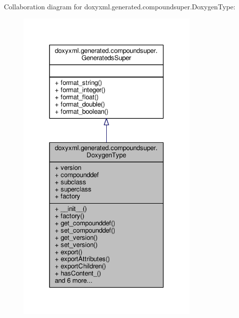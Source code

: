 Collaboration diagram for doxyxml.\+generated.\+compoundsuper.\+Doxygen\+Type\+:
\nopagebreak
\begin{figure}[H]
\begin{center}
\leavevmode
\includegraphics[width=254pt]{d6/dec/classdoxyxml_1_1generated_1_1compoundsuper_1_1DoxygenType__coll__graph}
\end{center}
\end{figure}
